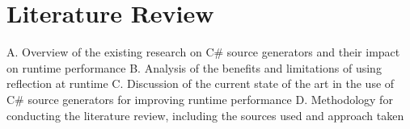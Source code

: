 \chapter{Literature Review}
A. Overview of the existing research on C\# source generators and their impact on runtime performance
B. Analysis of the benefits and limitations of using reflection at runtime
C. Discussion of the current state of the art in the use of C\# source generators for improving runtime performance
D. Methodology for conducting the literature review, including the sources used and approach taken